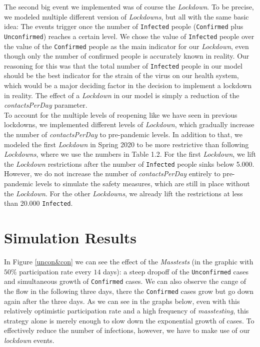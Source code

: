 \documentclass
[
    report,
    11pt,
    bibliography = totoc,
    listof = totoc,
    headinclude = true,
]
{scrreport}
\begin{document}
The second big event we implemented was of course the \textit{Lockdown}. To be precise,
we modeled multiple different version of \textit{Lockdowns}, but all with the same basic idea:
The events trigger once the number of \texttt{Infected} people (\texttt{Confirmed} plus \texttt{Unconfirmed})
reaches a certain level.
We chose the value of \texttt{Infected} people over the value of
the \texttt{Confirmed} people as the main indicator for our \textit{Lockdown}, even though only the number of confirmed people is accurately known in reality.
Our reasoning for this was that the total number of \texttt{Infected} people in our
model should be the best indicator for the strain of the virus on our health system,
which would be a major deciding factor in the decision to implement a lockdown in reality.
The effect of a \textit{Lockdown} in our model is simply a reduction of the \textit{contactsPerDay} parameter. \\
To account for the multiple levels of reopening like we have seen in previous
lockdowns, we implemented different levels of \textit{Lockdown}, which gradually increase
the number of \textit{contactsPerDay} to pre-pandemic levels.
In addition to that, we modeled the first \textit{Lockdown} in Spring 2020 to be more
restrictive than following \textit{Lockdowns}, where we use the numbers in Table 1.2.
For the first \textit{Lockdown}, we lift the \textit{Lockdown} restrictions after the number of \texttt{Infected}
people sinks below 5.000. However, we do not increase the number of \textit{contactsPerDay}
entirely to pre-pandemic levels to simulate the safety measures, which are still
in place without the \textit{Lockdown}.
For the other \textit{Lockdowns}, we already lift the restrictions at less than 20.000 \texttt{Infected}.


\begingroup
\renewcommand{\cleardoublepage}{}
\renewcommand{\clearpage}{}
\chapter{Simulation Results}
\endgroup

In Figure \ref{uncon&con} we can see the effect of the \textit{Masstests} (in the graphic with $50 \%$ participation rate every $14$ days): a steep dropoff of the \texttt{Unconfirmed} cases and simultaneous growth of \texttt{Confirmed} cases. We can also observe the cange of the flow in the following three days, there the \texttt{Confirmed} cases grow but go down again after the three days.
As we can see in the graphs below, even with this relatively optimistic participation rate
and a high frequency of \textit{masstesting}, this strategy alone is merely enough
to slow down the exponential growth of cases.
To effectively reduce the number of infections, however, we have to make use of our \textit{lockdown} events.
\end{document}
